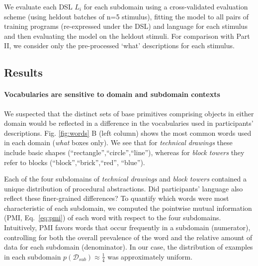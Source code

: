 \documentclass[10pt,letterpaper]{article}
\begin{document}
We evaluate each DSL $L_i$ for each subdomain using a cross-validated evaluation scheme (using heldout batches of n=5 stimulus), fitting the model to all pairs of training programs (re-expressed under the DSL) and language for each stimulus and then evaluating the model on the heldout stimuli. For comparison with Part II, we consider only the pre-processed `what' descriptions for each stimulus. 

\subsection{Results}


\paragraph{Vocabularies are sensitive to domain and subdomain contexts}

We suspected that the distinct sets of base primitives comprising objects in either domain would be reflected in a difference in the vocabularies used in participants' descriptions.
Fig. \ref{fig:words} B (left column) shows the most common words used in each domain (\textit{what} boxes only).
We see that for \textit{technical drawings} these include basic shapes (``rectangle'',``circle'',``line''), whereas for \textit{block towers} they refer to blocks (``block'',``brick'',``red'', ``blue'').

Each of the four subdomains of \textit{technical drawings} and \textit{block towers} contained a unique distribution of procedural abstractions.
Did participants' language also reflect these finer-grained differences?
To quantify which words were most characteristic of each subdomain, we computed the pointwise mutual information (PMI, Eq.~\ref{eq:pmi}) of each word with respect to the four subdomains. 
Intuitively, PMI favors words that occur frequently in a subdomain (numerator), controlling for both the overall prevalence of the word and the relative amount of data for each subdomain (denominator). In our case, the distribution of examples in each subdomain $p(\mathcal{D}_{sub}) \approx \frac{1}{4}$ was approximately uniform.
\end{document}
